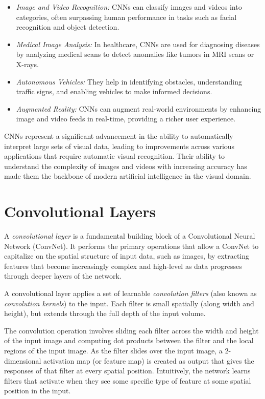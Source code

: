 \begin{itemize}
\item \emph{Image and Video Recognition:} CNNs can classify images and videos into categories, often surpassing human performance in tasks such as facial recognition and object detection.
\item \emph{Medical Image Analysis:} In healthcare, CNNs are used for diagnosing diseases by analyzing medical scans to detect anomalies like tumors in MRI scans or X-rays.
\item \emph{Autonomous Vehicles:} They help in identifying obstacles, understanding traffic signs, and enabling vehicles to make informed decisions.
\item \emph{Augmented Reality:} CNNs can augment real-world environments by enhancing image and video feeds in real-time, providing a richer user experience.
\end{itemize}

CNNs represent a significant advancement in the ability to automatically interpret large sets of visual data, leading to improvements across various applications that require automatic visual recognition. Their ability to understand the complexity of images and videos with increasing accuracy has made them the backbone of modern artificial intelligence in the visual domain.

\section{Convolutional Layers}

A \emph{convolutional layer} is a fundamental building block of a Convolutional Neural Network (ConvNet). It performs the primary operations that allow a ConvNet to capitalize on the spatial structure of input data, such as images, by extracting features that become increasingly complex and high-level as data progresses through deeper layers of the network.

A convolutional layer applies a set of learnable \emph{convolution filters} (also known as \emph{convolution kernels}) to the input. Each filter is small spatially (along width and height), but extends through the full depth of the input volume.

The convolution operation involves sliding each filter across the width and height of the input image and computing dot products between the filter and the local regions of the input image. As the filter slides over the input image, a 2-dimensional activation map (or feature map) is created as output that gives the responses of that filter at every spatial position. Intuitively, the network learns filters that activate when they see some specific type of feature at some spatial position in the input.

